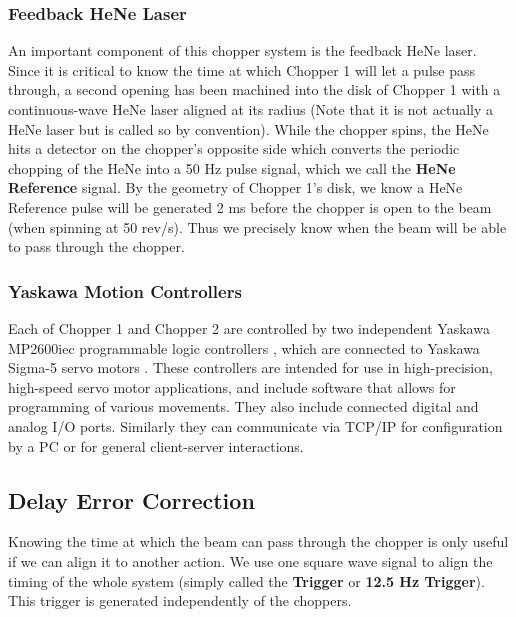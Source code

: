 \documentclass{article}
\begin{document}
        \subsubsection{Feedback HeNe Laser}
        
            An important component of this chopper system is the feedback HeNe laser. Since it is critical to know the time at which Chopper 1 will let a pulse pass through, a second opening has been machined into the disk of Chopper 1 with a continuous-wave HeNe laser aligned at its radius (Note that it is not actually a HeNe laser but is called so by convention). While the chopper spins, the HeNe hits a detector on the chopper's opposite side which converts the periodic chopping of the HeNe into a 50 Hz pulse signal, which we call the \textbf{HeNe Reference} signal. By the geometry of Chopper 1's disk, we know a HeNe Reference pulse will be generated 2 ms before the chopper is open to the beam (when spinning at 50 rev/s). Thus we precisely know when the beam will be able to pass through the chopper.
            
        \subsubsection{Yaskawa Motion Controllers}
        
            Each of Chopper 1 and Chopper 2 are controlled by two independent Yaskawa MP2600iec programmable logic controllers \cite{mp2600}, which are connected to Yaskawa Sigma-5 servo motors \cite{sigma5}. These controllers are intended for use in high-precision, high-speed servo motor applications, and include software that allows for programming of various movements. They also include connected digital and analog I/O ports. Similarly they can communicate via TCP/IP for configuration by a PC or for general client-server interactions. 
        
    \subsection{Delay Error Correction} \label{chopper_error}
    
        Knowing the time at which the beam can pass through the chopper is only useful if we can align it to another action. We use one square wave signal to align the timing of the whole system (simply called the \textbf{Trigger} or \textbf{12.5 Hz Trigger}). This trigger is generated independently of the choppers. 
\end{document}
